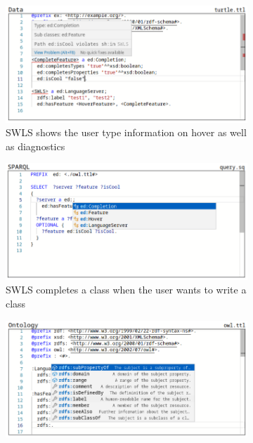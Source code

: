\begin{figure}[tb]
    \centering
    \begin{subfigure}{0.48\textwidth}
      \includegraphics[width=\textwidth]{./images/hover.png}
      \caption{SWLS shows the user type information on hover as well as diagnostics}
      \label{hover}
    \end{subfigure}
    \hfill
    \begin{subfigure}{0.48\textwidth}
      \includegraphics[width=\textwidth]{./images/class.png}
      \caption{SWLS completes a class when the user wants to write a class}
      \label{class_completion}
    \end{subfigure}
    \hfill
    \begin{subfigure}{0.48\textwidth}
      \includegraphics[width=\textwidth]{./images/property.png}

\end{subfigure}
\end{figure}
